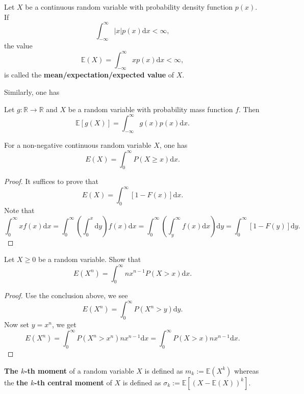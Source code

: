 \documentclass[11pt,singlecolumn, openany, citestyle=authoryear]{elegantbook}
\begin{document}
\begin{CJK}{UTF8}{gbsn}
\begin{definition}
    Let $X$ be a continuous random variable with probability density function $p(x)$. If 
    $$
    \int_{-\infty}^{\infty}|x|p(x)\mathrm{d}x<\infty,
    $$
    the value 
    \begin{equation}
        \mathbb{E}(X)=\int_{-\infty}^{\infty}xp(x)\mathrm{d}x<\infty,
    \end{equation}
    is called the \textbf{mean/expectation/expected value} of $X$.
\end{definition}
Similarly, one has 
\begin{lemma}\label{lem:lem3}
    Let $g:\mathbb{R}\to \mathbb{R}$ and $X$ be a random variable with probability
    mass function $f$. Then 
    $$    
    \mathbb{E}[g(X)] = \int_{-\infty}^\infty g(x)p(x)\mathrm{d}x.
    $$
\end{lemma}

\begin{lemma}
    For a non-negative continuous random variable $X$, one has 
    $$
    E(X)=\int_{0}^\infty P(X\geqslant x)\mathrm{d}x.
    $$
\end{lemma}
\begin{proof}
    It suffices to prove that 
    $$
    E(X)=\int_{0}^\infty [1-F(x)]\mathrm{d}x.
    $$
    Note that 
    $$
    \int_0^\infty xf(x)\mathrm{d}x=\int_0^\infty \left(\int_0^x \mathrm{d}y\right)
    f(x)\mathrm{d}x = \int_0^\infty \left(\int_y^\infty f(x)\mathrm{d}x\right)\mathrm{d}y=
    \int_0^\infty [1-F(y)]\mathrm{d}y.
    $$
\end{proof}
\begin{exercise}
    Let $X\geqslant 0$ be a random variable. Show that 
    $$
    E(X^n)=\int_0^\infty nx^{n-1}P(X>x)\mathrm{d}x.
    $$
\end{exercise}
\begin{proof}
    Use the conclusion above, we see 
    $$
    E(X^n)=\int_0^\infty P(X^n>y)\mathrm{d}y.
    $$
    Now set $y=x^n$, we get 
    $$
    E(X^n)=\int_0^\infty P(X^n>x^n)nx^{n-1}\mathrm{d}x=
    \int_0^\infty P(X>x)nx^{n-1}\mathrm{d}x.
    $$
\end{proof}


\begin{definition}
    \textbf{The $k$-th moment} of a random variable $X$ is defined as $m_k:=\mathbb{E}(X^k)$
    whereas the \textbf{the $k$-th central moment} of $X$ is defined as 
    $\sigma_k:=\mathbb{E}[(X-\mathbb{E}(X))^k]$.
\end{definition}


\end{CJK}
\end{document}
